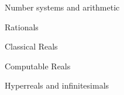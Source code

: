 \documentclass[12pt]{PalisadesLakesBook}
\begin{document}
\begin{plSection}{Number systems and arithmetic}
\begin{plSection}{Rationals}
\end{plSection}%
\begin{plSection}{Classical Reals}


\end{plSection}%
\begin{plSection}{Computable Reals}

\end{plSection}%
\begin{plSection}{Hyperreals and infinitesimals}

\end{plSection}%

\end{plSection}%


\end{document}
